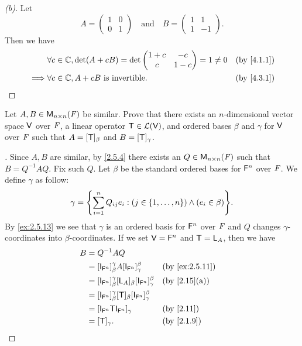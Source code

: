 \begin{proof}[(b)]
	Let
	\[
		A = \begin{pmatrix}
			1 & 0 \\
			0 & 1
		\end{pmatrix} \quad \text{and} \quad B = \begin{pmatrix}
			1 & 1  \\
			1 & -1
		\end{pmatrix}.
	\]
	Then we have
	\begin{align*}
		         & \forall c \in \C, \det(A + cB) = \det\begin{pmatrix}
			                                                1 + c & -c    \\
			                                                c     & 1 - c
		                                                \end{pmatrix} = 1 \neq 0 &  & \by{4.1.1} \\
		\implies & \forall c \in \C, A + cB \text{ is invertible}.      &  & \by{4.3.1}
	\end{align*}
\end{proof}

\begin{ex}\label{ex:5.1.19}
	Let \(A, B \in \mathsf{M}_{{n} \times n}({\mathit{F}})\) be similar.
	Prove that there exists an \(n\)-dimensional vector space \(\mathsf{V}\) over \(\mathit{F}\), a linear operator \(\mathsf{T} \in \mathcal{L}(\mathsf{V})\), and ordered bases \(\beta\) and \(\gamma\) for \(\mathsf{V}\) over \(\mathit{F}\) such that \(A = [\mathsf{T}]_{\beta}\) and \(B = [\mathsf{T}]_{\gamma}\).
\end{ex}

\begin{proof}[]
	Since \(A, B\) are similar, by \cref{2.5.4} there exists an \(Q \in \mathsf{M}_{{n} \times n}({\mathit{F}})\) such that \(B = Q^{-1} A Q\).
	Fix such \(Q\).
	Let \(\beta\) be the standard ordered bases for \(\mathsf{F}^n\) over \(\mathit{F}\).
	We define \(\gamma\) as follow:
	\[
		\gamma = \set{\sum_{i = 1}^n Q_{i j} e_i : (j \in \set{1, \dots, n}) \land (e_i \in \beta)}.
	\]
	By \cref{ex:2.5.13} we see that \(\gamma\) is an ordered basis for \(\mathsf{F}^n\) over \(\mathit{F}\) and \(Q\) changes \(\gamma\)-coordinates into \(\beta\)-coordinates.
	If we set \(\mathsf{V} = \mathsf{F}^n\) and \(\mathsf{T} = \mathsf{L}_A\), then we have
	\begin{align*}
		B & = Q^{-1} A Q                                                                                           \\
		  & = [\IT[\vs{F}^n]]_{\beta}^{\gamma} A [\IT[\vs{F}^n]]_{\gamma}^{\beta}              &  & \by{ex:2.5.11} \\
		  & = [\IT[\vs{F}^n]]_{\beta}^{\gamma} [\L_A]_{\beta} [\IT[\vs{F}^n]]_{\gamma}^{\beta} &  & \by{2.15}[a]   \\
		  & = [\IT[\vs{F}^n]]_{\beta}^{\gamma} [\T]_{\beta} [\IT[\vs{F}^n]]_{\gamma}^{\beta}                       \\
		  & = [\IT[\vs{F}^n] \T \IT[\vs{F}^n]]_{\gamma}                                        &  & \by{2.11}      \\
		  & = [\T]_{\gamma}.                                                                   &  & \by{2.1.9}
	\end{align*}
\end{proof}

